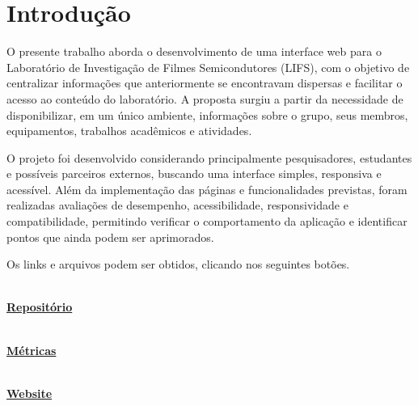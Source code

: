 
\section{Introdução}
O presente trabalho aborda o desenvolvimento de uma interface web para o Laboratório de Investigação de Filmes Semicondutores (LIFS), com o objetivo de centralizar informações que anteriormente se encontravam dispersas e facilitar o acesso ao conteúdo do laboratório. A proposta surgiu a partir da necessidade de disponibilizar, em um único ambiente, informações sobre o grupo, seus membros, equipamentos, trabalhos acadêmicos e atividades.

O projeto foi desenvolvido considerando principalmente pesquisadores, estudantes e possíveis parceiros externos, buscando uma interface simples, responsiva e acessível. Além da implementação das páginas e funcionalidades previstas, foram realizadas avaliações de desempenho, acessibilidade, responsividade e compatibilidade, permitindo verificar o comportamento da aplicação e identificar pontos que ainda podem ser aprimorados.

Os links e arquivos podem ser obtidos, clicando nos seguintes botões. 

\begin{center}
	
	\noindent
	\begin{minipage}[c]{0.30\textwidth}
		\centering
		\href{https://github.com/rick-12q/SCOM_1_LIFS_SITE}{
			\textcolor{githubcolor}{
				\Large\faGithub
			}
			\\[5pt]
			\textbf{\textcolor{githubcolor}{Repositório}}
		}
	\end{minipage}
	\hfill
	\begin{minipage}[c]{0.30\textwidth}
		\centering
		\href{https://github.com/rick-12q/SCOM_1_LIFS_SITE/tree/main/Relatorio/Metrics}{
			\textcolor{metricscolor}{
				\Large\faChartLine
			}
			\\[5pt]
			\textbf{\textcolor{metricscolor}{Métricas}}
		}
	\end{minipage}
	\hfill
	\begin{minipage}[c]{0.30\textwidth}
		\centering
		\href{https://rick-12q.github.io/SCOM_1_LIFS_SITE/}{
			\textcolor{websitecolor}{
				\Large\faGlobe
			}
			\\[5pt]
			\textbf{\textcolor{websitecolor}{Website}}
		}
	\end{minipage}
	
\end{center}

\newpage